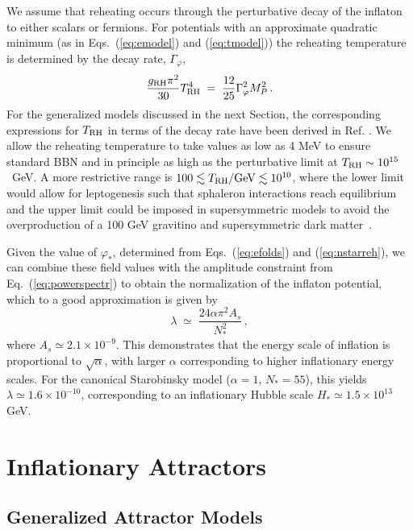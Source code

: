 \documentclass[aps,prev,twocolumn,preprintnumbers,floatfix,nofootinbib]{revtex4-1}
\newcommand{\beq}{\begin{equation}}
\newcommand{\eeq}{\end{equation}}
\begin{document}
We assume that reheating occurs through the perturbative decay of the inflaton to either 
scalars or fermions. For potentials with an approximate quadratic minimum (as in Eqs.~(\ref{eq:emodel}) and (\ref{eq:tmodel})) the reheating temperature is determined by the decay rate, $\Gamma_\varphi$,
\beq
\frac{g_{\rm RH} \pi^2}{30} T_{\rm RH}^4  \; = \; \frac{12}{25} \Gamma_\varphi^2 M_P^2 \, .
\label{trh}
\eeq
For the generalized models discussed in the next Section, the corresponding expressions for $T_{\rm RH}$ in terms of the decay rate have been derived in Ref. \cite{gkmo2}. We allow the reheating temperature to take values as low as 4 MeV to ensure standard BBN \cite{tr4} and in principle
as high as the perturbative limit at $T_{\rm RH} \sim 10^{15}$~GeV. A more restrictive range is $100 \lesssim T_{\rm RH}/{\rm GeV} \lesssim 10^{10}$, where the lower limit would allow for leptogenesis such that sphaleron interactions reach equilibrium \cite{fy} and the upper limit could be imposed in supersymmetric models to avoid the overproduction of a 100 GeV gravitino and supersymmetric dark matter~\cite{ego,ENOV4}.



Given the value of $\varphi_*$, determined from Eqs.~(\ref{eq:efolds}) and (\ref{eq:nstarreh}), we can 
 combine these field values with the amplitude constraint from Eq.~(\ref{eq:powerspectr}) to obtain the normalization of the inflaton potential, which to a good approximation is given by
\begin{equation}
\label{eq:infnorm}
\lambda \; \simeq \; \frac{24\alpha\pi^2 A_{s}}{N_*^2} \, ,
\end{equation}
where $A_s \simeq 2.1 \times 10^{-9}$. This demonstrates that the energy scale of inflation is proportional to $\sqrt{\alpha}$, with larger $\alpha$ corresponding to higher inflationary energy scales. For the canonical Starobinsky model ($\alpha = 1$, $N_* = 55$), this yields $\lambda \simeq 1.6 \times 10^{-10}$, corresponding to an inflationary Hubble scale $H_* \simeq 1.5 \times 10^{13}$ GeV. 

\section{Inflationary Attractors}
\label{sec:infact}

\subsection{Generalized Attractor Models}
\label{sec:generalized}
\end{document}
